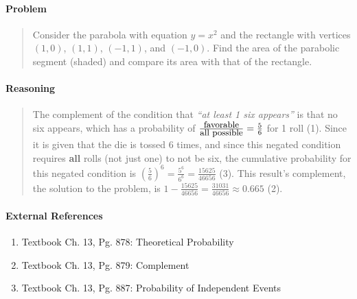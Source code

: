\documentclass[letterpaper,12pt,twoside]{report}
\begin{document}
	\pagestyle{fancy}
	\fancyhf{}
	
	\paragraph{Problem}
	\begin{quote}
	\textsf{Consider the parabola with equation $y = x^2$ and the rectangle with vertices $(1,0)$, $(1,1)$, $(-1,1)$, and $(-1, 0)$. Find the area of the parabolic segment (shaded) and compare its area with that of the rectangle.}
	\end{quote}
	
	\begin{center}
	\end{center}
	
	\paragraph{Reasoning}
	\begin{quotation}
	
	The complement of the condition that \textit{``at least 1 six appears''} is that no six appears, which has a probability of $\frac{\textrm{\small{favorable}}}{\textrm{\small{all possible}}} = \frac{5}{6}$ for 1 roll (1). Since it is given that the die is tossed 6 times, and since this negated condition requires \textbf{all} rolls (not just one) to not be six, the cumulative probability for this negated condition is $(\frac{5}{6})^6 = \frac{5^6}{6^6} = \frac{15625}{46656}$ (3). This result's complement, the solution to the problem, is $1-\frac{15625}{46656} = \boxed{\frac{31031}{46656} \approx 0.665}$ (2).
	
	\end{quotation}
	
	\paragraph{External References}
	
	\begin{enumerate}
		\item Textbook Ch. 13, Pg. 878: Theoretical Probability
		\item Textbook Ch. 13, Pg. 879: Complement
		\item Textbook Ch. 13, Pg. 887: Probability of Independent Events
	\end{enumerate}
\end{document}
